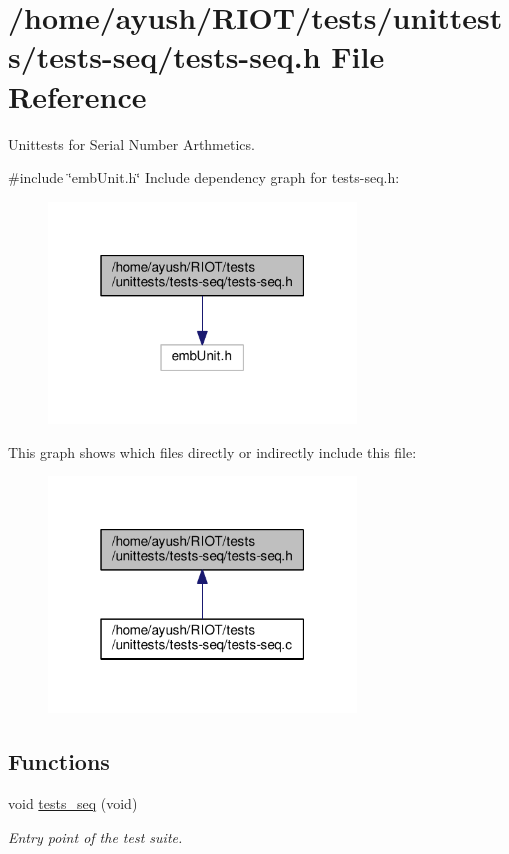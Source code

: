 \hypertarget{tests-seq_8h}{}\section{/home/ayush/\+R\+I\+O\+T/tests/unittests/tests-\/seq/tests-\/seq.h File Reference}
\label{tests-seq_8h}


Unittests for Serial Number Arthmetics.  


{\ttfamily \#include \char`\"{}emb\+Unit.\+h\char`\"{}}\newline
Include dependency graph for tests-\/seq.h\+:
\nopagebreak
\begin{figure}[H]
\begin{center}
\leavevmode
\includegraphics[width=232pt]{tests-seq_8h__incl}
\end{center}
\end{figure}
This graph shows which files directly or indirectly include this file\+:
\nopagebreak
\begin{figure}[H]
\begin{center}
\leavevmode
\includegraphics[width=232pt]{tests-seq_8h__dep__incl}
\end{center}
\end{figure}
\subsection*{Functions}
\begin{DoxyCompactItemize}
\item 
void \hyperlink{group__unittests_gaad689d0f2a9566f1cc70188eabdfd24c}{tests\+\_\+seq} (void)
\begin{DoxyCompactList}\small\item\em Entry point of the test suite. \end{DoxyCompactList}\end{DoxyCompactItemize}


